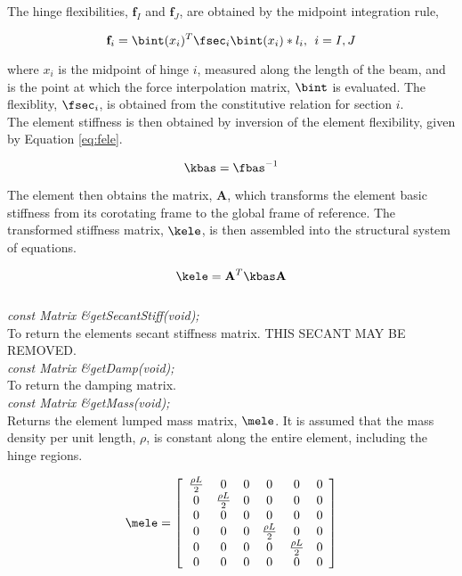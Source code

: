 The hinge flexibilities, $\mathbf{f}_I$ and $\mathbf{f}_J$, are obtained
by the midpoint integration rule,

\begin{equation}
{\mathbf{f}}_i = \bint(x_i)^T \fsec_i \bint(x_i) * l_i, \:\: i=I,J
\end{equation}

where $x_i$ is the midpoint of hinge $i$, measured along the length of the
beam, and is the point at which the force interpolation matrix, $\bint$
is evaluated.  The flexiblity, $\fsec_i$, is obtained from the
constitutive relation for section $i$. \\

The element stiffness is then obtained by inversion of the element flexibility,
given by Equation \ref{eq:fele}.

\begin{equation}
\label{eq:kele}
\kbas = \fbas^{-1}
\end{equation}

The element then obtains the matrix, $\mathbf{A}$, which transforms the element basic
stiffness from its corotating frame to the global frame of reference.  The transformed
stiffness matrix, $\kele$, is then assembled into the structural system of equations.

\begin{equation}
\kele = \mathbf{A}^T \kbas \mathbf{A}
\end{equation} \\

{\em const Matrix \&getSecantStiff(void);} \\
To return the elements secant stiffness matrix. THIS SECANT MAY
BE REMOVED. \\

{\em const Matrix \&getDamp(void);} \\
To return the damping matrix. \\ 

{\em const Matrix \&getMass(void);} \\
Returns the element lumped mass matrix, $\mele$. It is assumed that the mass density per unit
length, $\rho$, is constant along the entire element, including the hinge regions.

\begin{equation}
\label{eq:mele}
\mele = \left[
   \begin{array}{c c c c c c}
      \frac{\rho L}{2} & 0 & 0 & 0 & 0 & 0 \\
      0 & \frac{\rho L}{2} & 0 & 0 & 0 & 0 \\
      0 & 0 & 0 & 0 & 0 & 0 \\
      0 & 0 & 0 & \frac{\rho L}{2} & 0 & 0 \\
      0 & 0 & 0 & 0 & \frac{\rho L}{2} & 0 \\
      0 & 0 & 0 & 0 & 0 & 0
   \end{array}
 \right]
\end{equation}

